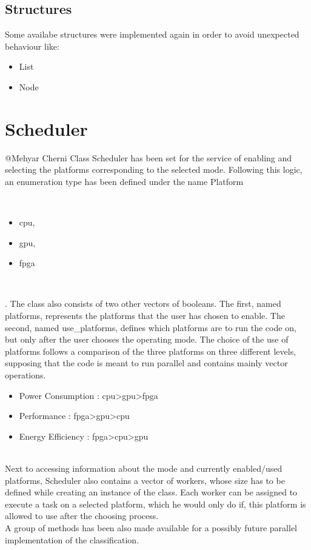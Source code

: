 \documentclass[parskip=full]{scrartcl}
\newcommand\tab[1][1cm]{\hspace*{#1}}
\begin{document}
	\subsection{Structures} \label{Structures}
		\tab Some availabe structures were implemented again in order to avoid unexpected behaviour like:
		\begin{itemize}
			\item List
			\item Node
		\end{itemize} 
		
\pagebreak

\section{Scheduler} \label{Scheduler}
	@Mehyar Cherni
	\tab Class Scheduler has been set for the service of enabling and selecting the platforms corresponding to the selected mode. Following this logic, an enumeration type has been defined under the name Platform { \\ 
	\begin {itemize}
		\item cpu, 
		\item gpu, 
		\item fpga
	\end{itemize} \\
	}. The class also consists of two other vectors of booleans. The first, named platforms, represents the platforms that the user has chosen to enable. The second, named use_platforms, defines which platforms are to run the code on, but only after the user chooses the operating mode. The choice of the use of platforms follows a comparison of the three platforms on three different levels, supposing that the code is meant to run parallel and contains mainly vector operations. \\
	\begin {itemize}
		\item Power Consumption : cpu>gpu>fpga
		\item Performance : fpga>gpu>cpu
		\item Energy Efficiency : fpga>cpu>gpu
	\end{itemize}
\\ Next to accessing information about the mode and currently enabled/used platforms, Scheduler also contains a vector of workers, whose size has to be defined while creating an instance of the class. Each worker can be assigned to execute a task on a selected platform, which he would only do if, this platform is allowed to use after the choosing process. \\A group of methods has been also made available for a possibly future parallel implementation of the classification.\\
\end{document}
